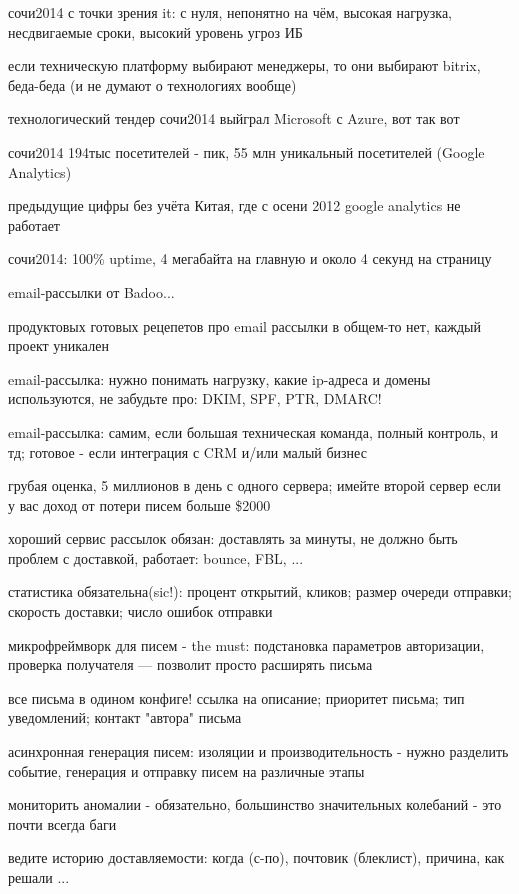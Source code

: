   \item сочи2014 с точки зрения it: с нуля, непонятно на чём, высокая нагрузка, несдвигаемые сроки, высокий уровень угроз ИБ
  \item если техническую платформу выбирают менеджеры, то они выбирают bitrix, беда-беда (и не думают о технологиях вообще)
  \item технологический тендер сочи2014 выйграл Microsoft с Azure, вот так вот
  \item сочи2014 194тыс посетителей - пик, 55 млн уникальный посетителей (Google Analytics)
  \item предыдущие цифры без учёта Китая, где с осени 2012 google analytics не работает
  \item сочи2014: 100\% uptime, 4 мегабайта на главную и около 4 секунд на страницу
  \item email-рассылки от Badoo...
  \item продуктовых готовых рецепетов про email рассылки в общем-то нет, каждый проект уникален
  \item email-рассылка: нужно понимать нагрузку, какие ip-адреса и домены используются, не забудьте про: DKIM, SPF, PTR, DMARC!
  \item email-рассылка: самим, если большая техническая команда, полный контроль, и тд; готовое - если интеграция с CRM и/или малый бизнес
  \item грубая оценка, 5 миллионов в день с одного сервера; имейте второй сервер если у вас доход от потери писем больше \$2000
  \item хороший сервис рассылок обязан: доставлять за минуты, не должно быть проблем с доставкой, работает: bounce, FBL, ...
  \item статистика обязательна(sic!): процент открытий, кликов; размер очереди отправки; скорость доставки; число ошибок отправки
  \item микрофреймворк для писем - the must: подстановка параметров авторизации, проверка получателя --- позволит просто расширять письма
  \item все письма в одином конфиге! ссылка на описание; приоритет письма; тип уведомлений; контакт "автора" письма
  \item асинхронная генерация писем: изоляции и производительность - нужно разделить событие, генерация и отправку писем на различные этапы
  \item мониторить аномалии - обязательно, большинство значительных колебаний - это почти всегда баги
  \item ведите историю доставляемости: когда (с-по), почтовик (блеклист), причина, как решали ...
